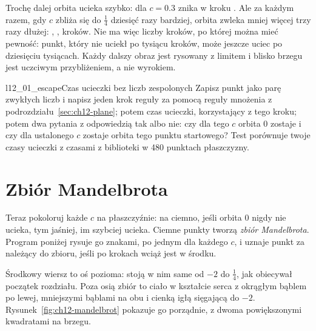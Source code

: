 

\noindent
Trochę dalej orbita ucieka szybko: dla $c = \num{0.3}$ znika w kroku
. Ale za każdym razem, gdy $c$ zbliża się do
$\tfrac14$ dziesięć razy bardziej,
orbita zwleka mniej więcej trzy razy dłużej: ,
,  kroków. Nie ma więc liczby kroków,
po której można mieć pewność: punkt, który nie uciekł po tysiącu kroków,
może jeszcze uciec po dziesięciu tysiącach. Każdy dalszy obraz jest
rysowany z limitem i blisko brzegu jest uczciwym przybliżeniem, a nie
wyrokiem.

\begin{lab}{l12_01_escape}{Czas ucieczki bez liczb zespolonych}
Zapisz punkt jako parę zwykłych liczb i napisz jeden krok reguły za pomocą
reguły mnożenia z podrozdziału~\ref{sec:ch12-plane}; potem czas ucieczki,
korzystający z tego kroku; potem dwa pytania z odpowiedzią tak albo nie:
czy dla tego $c$ orbita $0$ zostaje i czy dla ustalonego $c$ zostaje orbita
tego punktu startowego? Test porównuje twoje czasy ucieczki z czasami z
biblioteki w 480 punktach płaszczyzny.
\end{lab}

\section{Zbiór Mandelbrota}
\label{sec:ch12-mset}

\noindent
Teraz pokoloruj każde $c$ na płaszczyźnie: na ciemno, jeśli orbita $0$ nigdy
nie ucieka, tym jaśniej, im szybciej ucieka. Ciemne punkty tworzą
\emph{zbiór Mandelbrota}. Program poniżej rysuje go znakami, po jednym dla
każdego $c$, i uznaje punkt za należący do zbioru, jeśli po
 krokach wciąż jest w środku.


\noindent\begin{minipage}{\linewidth}
\end{minipage}

\noindent
Środkowy wiersz to oś pozioma: stoją w nim same  od $-2$ do
$\tfrac14$, jak obiecywał początek rozdziału. Poza osią zbiór to ciało w
kształcie serca z okrągłym bąblem po lewej, mniejszymi bąblami na obu i
cienką igłą sięgającą do $-2$. Rysunek~\ref{fig:ch12-mandelbrot} pokazuje go
porządnie, z dwoma powiększonymi kwadratami na brzegu.

